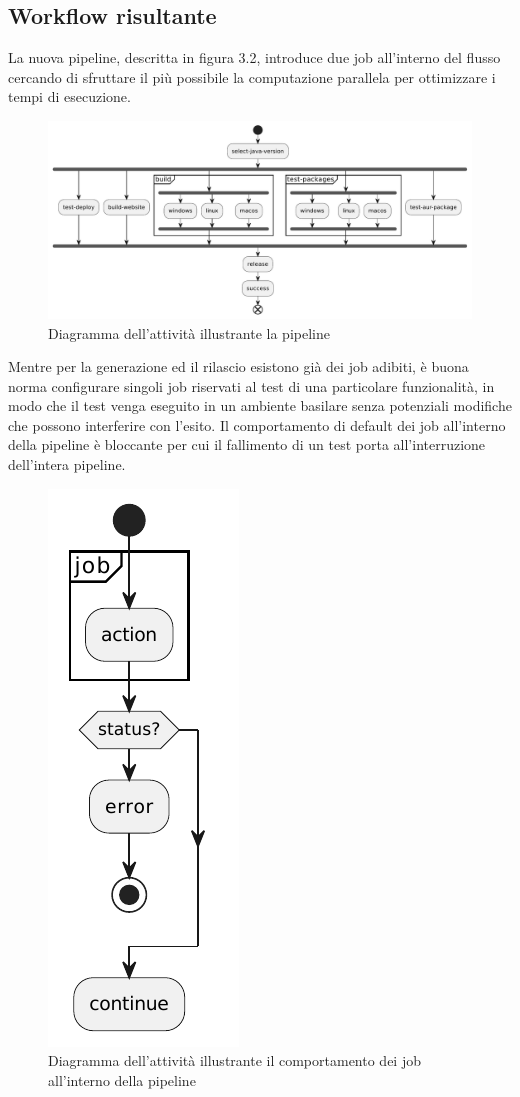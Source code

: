 \subsection{Workflow risultante} La nuova pipeline, descritta in figura 3.2, introduce due job all'interno del flusso cercando di sfruttare il più possibile la computazione parallela per ottimizzare i tempi di esecuzione.
\begin{figure}[H]
	\centering
	\includegraphics[width=1\linewidth]{figures/activity-diagram-pipeline.pdf}
	\caption{Diagramma dell'attività illustrante la pipeline}
	\label{fig:activity-diagram-pipeline}
\end{figure}
Mentre per la generazione ed il rilascio esistono già dei job adibiti, è buona norma configurare singoli job riservati al test di una particolare funzionalità, in modo che il test venga eseguito in un ambiente basilare senza potenziali modifiche che possono interferire con l'esito. Il comportamento di default dei job all'interno della pipeline è bloccante per cui il fallimento di un test porta all'interruzione dell'intera pipeline.

\begin{figure}[H]
	\centering
	\includegraphics[width=.13\linewidth]{figures/activity-diagram-job.pdf}
	\caption{Diagramma dell'attività illustrante il comportamento dei job all'interno della pipeline}
	\label{fig:activity-diagram-job}
\end{figure}

